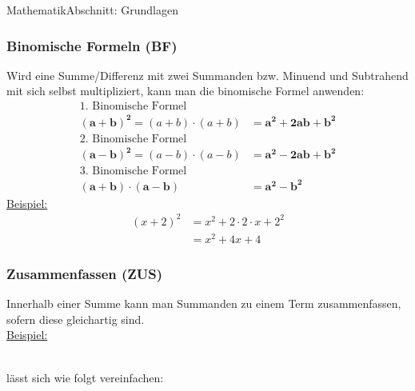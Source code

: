 \documentclass[11pt,twocolumn,oneside,openany,headings=optiontotoc,11pt,numbers=noenddot]{article}
\begin{document}
\begin{worksheet}{}{Mathematik}{Abschnitt: Grundlagen}
		\subsubsection*{Binomische Formeln (BF)}
		Wird eine Summe/Differenz mit zwei Summanden bzw. Minuend und Subtrahend mit sich selbst multipliziert, kann man die binomische Formel anwenden:\\
		\begin{align*}
			\text{1. Binomische Formel}\\
			\mathbf{(a+b)^2} = (a + b)\cdot{}(a + b) & = \mathbf{a^2 + 2ab + b^2}\\
			\text{2. Binomische Formel}\\
			\mathbf{(a-b)^2} = (a - b)\cdot{}(a - b) & = \mathbf{a^2 - 2ab + b^2}\\
			\text{3. Binomische Formel}\\
			\mathbf{(a + b)\cdot{}(a - b)} & = \mathbf{a^2 - b^2}
		\end{align*}
		\underline{Beispiel:}
		\begin{align*}
			(x + 2)^2 & = x^2 + 2\cdot{}2\cdot{}x + 2^2\\
			& = x^2 + 4x + 4
		\end{align*}
		\subsubsection*{Zusammenfassen (ZUS)}
		Innerhalb einer Summe kann man Summanden zu einem Term zusammenfassen, sofern diese \glqq{}gleichartig\grqq{} sind.\\
		\underline{Beispiel:}\\
		     \\
		\par\noindent
		lässt sich wie folgt vereinfachen:\\
		  

\end{worksheet}
\end{document}
